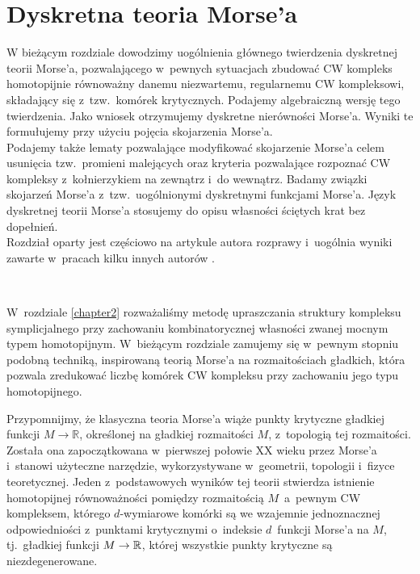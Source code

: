 \chapter{Dyskretna teoria Morse'a}\label{chapter3}
\begin{center}
\begin{minipage}{14cm}
{\small  W bieżącym rozdziale dowodzimy uogólnienia głównego twierdzenia dyskretnej teorii Morse'a, pozwalającego w~pewnych sytuacjach zbudować CW kompleks homotopijnie równoważny danemu niezwartemu, regularnemu CW kompleksowi, składający się z~tzw.~komórek krytycznych. Podajemy algebraiczną wersję tego twierdzenia. Jako wniosek otrzymujemy dyskretne nierówności Morse'a. Wyniki te formułujemy przy użyciu pojęcia skojarzenia Morse'a.\\

Podajemy także lematy pozwalające modyfikować skojarzenie Morse'a celem usunięcia tzw.~promieni malejących oraz kryteria pozwalające rozpoznać CW kompleksy z~kołnierzykiem na zewnątrz i~do wewnątrz. Badamy związki skojarzeń Morse'a z~tzw.~uogólnionymi dyskretnymi funkcjami Morse'a. Język dyskretnej teorii Morse'a stosujemy do opisu własności %
ściętych krat bez dopełnień.\\

Rozdział oparty jest częściowo na artykule autora rozprawy \cite{Kukiela13} i~uogólnia wyniki zawarte w~pracach kilku innych autorów \cite{Adiprasito13,Ayala07,Ayala09,Baclawski12,Forman98,Forman02}.}
\end{minipage}\\[1.7cm]
\end{center}

W~rozdziale \ref{chapter2} rozważaliśmy metodę upraszczania struktury kompleksu symplicjalnego przy zachowaniu kombinatorycznej własności zwanej mocnym typem homotopijnym. W~bieżącym rozdziale zamujemy się w~pewnym stopniu podobną techniką, inspirowaną teorią Morse'a na rozmaitościach gładkich, która pozwala zredukować liczbę komórek CW kompleksu przy zachowaniu jego typu homotopijnego.

Przypomnijmy, że klasyczna teoria Morse'a \cite{Banyaga04, Milnor63} wiąże punkty krytyczne gładkiej funkcji $M\to \mathbb{R}$, określonej na gładkiej rozmaitości $M$, z~topologią tej rozmaitości. Została ona zapoczątkowana w~pierwszej połowie XX wieku przez Morse'a \cite{Morse25} i~stanowi użyteczne narzędzie, wykorzystywane w~geometrii, topologii i~fizyce teoretycznej. Jeden z~podstawowych wyników tej teorii stwierdza istnienie homotopijnej równoważności pomiędzy rozmaitością $M$~a~pewnym CW kompleksem, którego $d$-wymiarowe komórki są we wzajemnie jednoznacznej odpowiedniości z~punktami krytycznymi o~indeksie $d$~funkcji Morse'a na $M$, tj.~gładkiej funkcji $M\to \mathbb{R}$, której wszystkie punkty krytyczne są niezdegenerowane.

